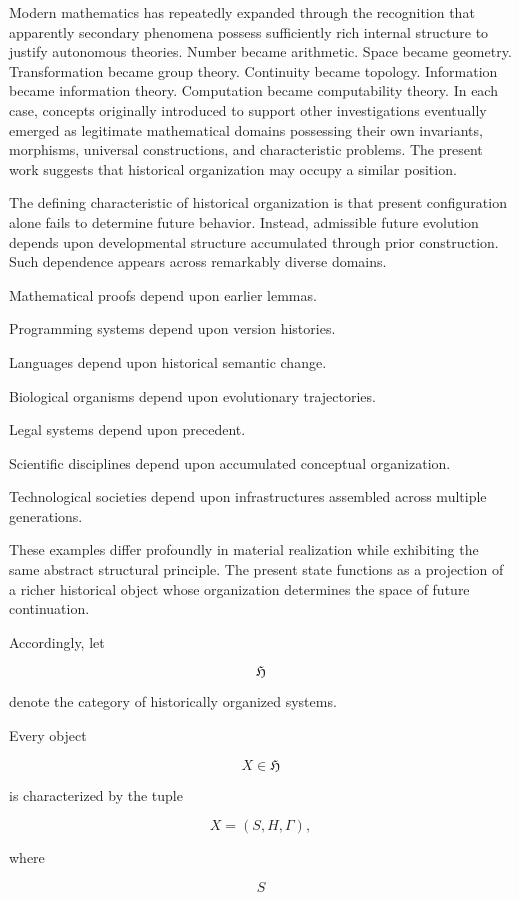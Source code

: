 \documentclass[12pt,oneside]{article}
\theoremstyle{remark}
\begin{document}
Modern mathematics has repeatedly expanded through the recognition that
apparently secondary phenomena possess sufficiently rich internal structure to
justify autonomous theories. Number became arithmetic. Space became geometry.
Transformation became group theory. Continuity became topology. Information
became information theory. Computation became computability theory. In each
case, concepts originally introduced to support other investigations eventually
emerged as legitimate mathematical domains possessing their own invariants,
morphisms, universal constructions, and characteristic problems. The present
work suggests that historical organization may occupy a similar position.

The defining characteristic of historical organization is that present
configuration alone fails to determine future behavior. Instead, admissible
future evolution depends upon developmental structure accumulated through prior
construction. Such dependence appears across remarkably diverse domains.

Mathematical proofs depend upon earlier lemmas.

Programming systems depend upon version histories.

Languages depend upon historical semantic change.

Biological organisms depend upon evolutionary trajectories.

Legal systems depend upon precedent.

Scientific disciplines depend upon accumulated conceptual organization.

Technological societies depend upon infrastructures assembled across multiple
generations.

These examples differ profoundly in material realization while exhibiting the
same abstract structural principle. The present state functions as a projection
of a richer historical object whose organization determines the space of future
continuation.

Accordingly, let

\[
\mathfrak H
\]

denote the category of historically organized systems.

Every object

\[
X
\in
\mathfrak H
\]

is characterized by the tuple

\[
X
=
(S,H,\Gamma),
\]

where

\[
S
\]
\end{document}
